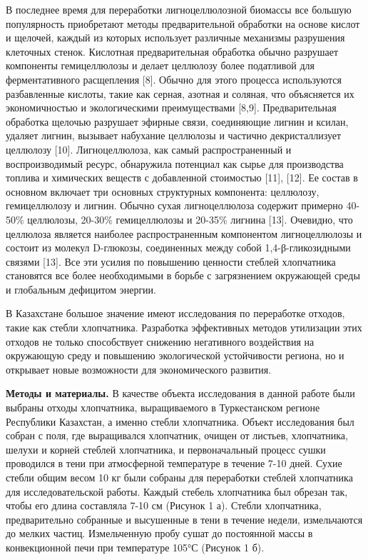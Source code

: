 \begin{multicols}{2}
В последнее время для переработки лигноцеллюлозной биомассы все большую
популярность приобретают методы предварительной обработки на основе
кислот и щелочей, каждый из которых использует различные механизмы
разрушения клеточных стенок. Кислотная предварительная обработка обычно
разрушает компоненты гемицеллюлозы и делает целлюлозу более податливой
для ферментативного расщепления {[}8{]}. Обычно для этого процесса
используются разбавленные кислоты, такие как серная, азотная и соляная,
что объясняется их экономичностью и экологическими преимуществами
{[}8,9{]}. Предварительная обработка щелочью разрушает эфирные связи,
соединяющие лигнин и ксилан, удаляет лигнин, вызывает набухание
целлюлозы и частично декристаллизует целлюлозу {[}10{]}. Лигноцеллюлоза,
как самый распространенный и воспроизводимый ресурс, обнаружила
потенциал как сырье для производства топлива и химических веществ с
добавленной стоимостью {[}11{]}, {[}12{]}. Ее состав в основном включает
три основных структурных компонента: целлюлозу, гемицеллюлозу и лигнин.
Обычно сухая лигноцеллюлоза содержит примерно 40-50\% целлюлозы,
20-30\% гемицеллюлозы и 20-35\% лигнина {[}13{]}. Очевидно, что
целлюлоза является наиболее распространенным компонентом лигноцеллюлозы
и состоит из молекул D-глюкозы, соединенных между собой
1,4-β-гликозидными связями {[}13{]}. Все эти усилия по повышению
ценности стеблей хлопчатника становятся все более необходимыми в борьбе
с загрязнением окружающей среды и глобальным дефицитом энергии.

В Казахстане большое значение имеют исследования по переработке отходов,
такие как стебли хлопчатника. Разработка эффективных методов утилизации
этих отходов не только способствует снижению негативного воздействия на
окружающую среду и повышению экологической устойчивости региона, но и
открывает новые возможности для экономического развития.

{\bfseries Методы и материалы.} В качестве объекта исследования в данной
работе были выбраны отходы хлопчатника, выращиваемого в Туркестанском
регионе Республики Казахстан, а именно стебли хлопчатника. Объект
исследования был собран с поля, где выращивался хлопчатник, очищен от
листьев, хлопчатника, шелухи и корней стеблей хлопчатника, и
первоначальный процесс сушки проводился в тени при атмосферной
температуре в течение 7-10 дней. Сухие стебли общим весом 10 кг были
собраны для переработки стеблей хлопчатника для исследовательской
работы. Каждый стебель хлопчатника был обрезан так, чтобы его длина
составляла 7-10 см (Рисунок 1 а). Стебли хлопчатника, предварительно
собранные и высушенные в тени в течение недели, измельчаются до мелких
частиц. Измельченную пробу сушат до постоянной массы в конвекционной
печи при температуре 105°С (Рисунок 1 б).
\end{multicols}

